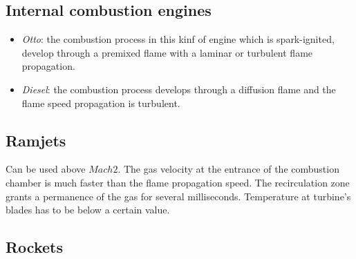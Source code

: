 \documentclass[12pt]{article}
\begin{document}
\subsection{Internal combustion engines}

\begin{itemize}
    \item \textit{Otto}: the combustion process in this kinf of engine which is spark-ignited, develop through a premixed flame with a laminar or turbulent flame propagation.
    \item  \textit{Diesel}: the combustion process develops through a diffusion flame and the flame speed propagation is turbulent.
\end{itemize}

\subsection{Ramjets}

Can be used above $Mach 2$. The gas velocity at the entrance of the combustion chamber is much faster than the flame propagation speed. The recirculation zone grants a permanence of the gas for several milliseconds. Temperature at turbine's blades has to be below a certain value.

\subsection{Rockets}
\end{document}
